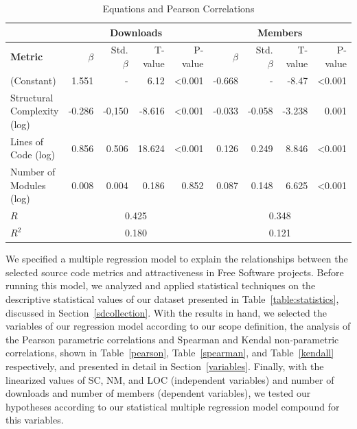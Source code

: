 \documentclass[conference]{IEEEtran}
\begin{document}
\begin{center}
\begin{table}[hbt]
\centering \caption{Equations and Pearson Correlations}
\begin{tabular}{|l|r|r|r|r|r|r|r|r|} \hline

& \multicolumn{4}{|c|}{Downloads} & \multicolumn{4}{|c|}{Members}\\ \hline
  
\textbf{Metric} & $\beta$ & Std. $\beta$ & T-value & P-value & $\beta$ & Std. $\beta$ & T-value & P-value
\\ \hline
(Constant) & 1.551 & - & 6.12 & \textless 0.001 & -0.668 & - & -8.47 & \textless 0.001
\\ \hline
Structural Complexity (log) & -0.286 & -0,150 & -8.616 & \textless 0.001 & -0.033 & -0.058 & -3.238 & 0.001
\\ \hline
Lines of Code (log) & 0.856 & 0.506 & 18.624 & \textless 0.001 & 0.126 & 0.249 & 8.846 & \textless 0.001
\\ \hline
Number of Modules (log) & 0.008 & 0.004 & 0.186 & 0.852 & 0.087 & 0.148 & 6.625 & \textless 0.001
\\ \hline
   \hline
$R$ & \multicolumn{4}{|c|}{0.425} & \multicolumn{4}{|c|}{0.348}\\ \hline
$R^2$ & \multicolumn{4}{|c|}{0.180} & \multicolumn{4}{|c|}{0.121}\\ \hline
\end{tabular}
\label{table:regression}
\end{table}
\end{center}

We specified a multiple regression model to explain the relationships 
between the selected source code metrics and attractiveness in Free Software projects.
%
Before running this model, we analyzed and applied statistical techniques 
on the descriptive statistical values of our dataset presented in
Table~\ref{table:statistics}, discussed in Section~\ref{sdcollection}.
%
With the results in hand, we selected the variables of our regression model according to our scope
definition, the analysis of the Pearson parametric
correlations and Spearman and Kendal non-parametric correlations,
shown in Table~\ref{pearson}, Table~\ref{spearman}, and Table~\ref{kendall} respectively,
and presented in detail in Section~\ref{variables}.
Finally, with the linearized values of SC, NM, and LOC (independent variables) 
and number of downloads and number of members (dependent variables), we tested 
our hypotheses according to our statistical multiple regression model compound
for this variables.
\end{document}
